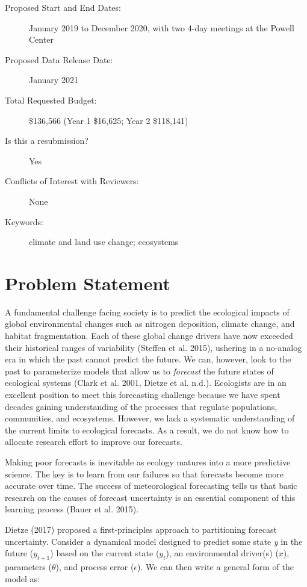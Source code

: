 \documentclass[12pt,]{article}
\begin{document}
\begin{description}
\item[Proposed Start and End Dates:] January 2019 to December 2020, with two 4-day meetings at the Powell Center
\item[Proposed Data Release Date:] January 2021
\item[Total Requested Budget:] \$136,566 (Year 1 \$16,625; Year 2 \$118,141)
\item[Is this a resubmission?] Yes
\item[Conflicts of Interest with Reviewers:] None
\item[Keywords:] climate and land use change; ecosystems
\end{description}

\newpage{}


\section{Problem Statement}

A fundamental challenge facing society is to predict the ecological
impacts of global environmental changes such as nitrogen deposition,
climate change, and habitat fragmentation. Each of these global change
drivers have now exceeded their historical ranges of variability
(Steffen et al. 2015), ushering in a no-analog era in which the past
cannot predict the future. We can, however, look to the past to
parameterize models that allow us to \emph{forecast} the future states
of ecological systems (Clark et al. 2001, Dietze et al. n.d.).
Ecologists are in an excellent position to meet this forecasting
challenge because we have spent decades gaining understanding of the
processes that regulate populations, communities, and ecosystems.
However, we lack a systematic understanding of the current limits to
ecological forecasts. As a result, we do not know how to allocate
research effort to improve our forecasts.

Making poor forecasts is inevitable as ecology matures into a more
predictive science. The key is to learn from our failures so that
forecasts become more accurate over time. The success of meteorological
forecasting tells us that basic research on the causes of forecast
uncertainty is an essential component of this learning process (Bauer et
al. 2015).

Dietze (2017) proposed a first-principles approach to partitioning
forecast uncertainty. Consider a dynamical model designed to predict
some state \emph{y} in the future (\(y_{t+1}\)) based on the current
state (\(y_{t}\)), an environmental driver(s) (\(x\)), parameters
(\(\theta\)), and process error (\(\epsilon\)). We can then write a
general form of the model as: \vspace{-3em}
\end{document}
